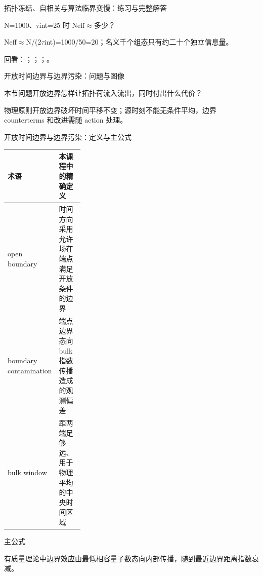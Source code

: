 \begin{frame}[t]{拓扑冻结、自相关与算法临界变慢：练习与完整解答}
\footnotesize
\begin{block}{}N=1000、\ensuremath{\tau}int=25 时 Neff\ensuremath{\approx}多少？\end{block}
\begin{exampleblock}{}Neff\ensuremath{\approx}N/\allowbreak{}(2\ensuremath{\tau}int)=1000/\allowbreak{}50=20；名义千个组态只有约二十个独立信息量。\end{exampleblock}
\vfill
\scriptsize 回看：；；；。
\end{frame}

\begin{frame}[t]{开放时间边界与边界污染：问题与图像}
\footnotesize
\begin{block}{本节问题}开放边界怎样让拓扑荷流入流出，同时付出什么代价？\end{block}
\begin{block}{物理原则}\quad 开放边界破坏时间平移不变；源时刻不能无条件平均，边界 counterterms 和改进需随 action 处理。\end{block}
\end{frame}

\begin{frame}[t]{开放时间边界与边界污染：定义与主公式}
\footnotesize\begin{tabularx}{\linewidth}{p{0.30\linewidth}Y}
\toprule 术语 & 本课程中的精确定义\\\midrule
{} open boundary & 时间方向采用允许场在端点满足开放条件的边界\\
 boundary contamination & 端点边界态向 bulk 指数传播造成的观测偏差\\
 bulk window & 距两端足够远、用于物理平均的中央时间区域\\
\bottomrule\end{tabularx}\vspace{0.15cm}
\begin{block}{ 主公式}\centering{}\end{block}
有质量理论中边界效应由最低相容量子数态向内部传播，随到最近边界距离指数衰减。
\end{frame}

